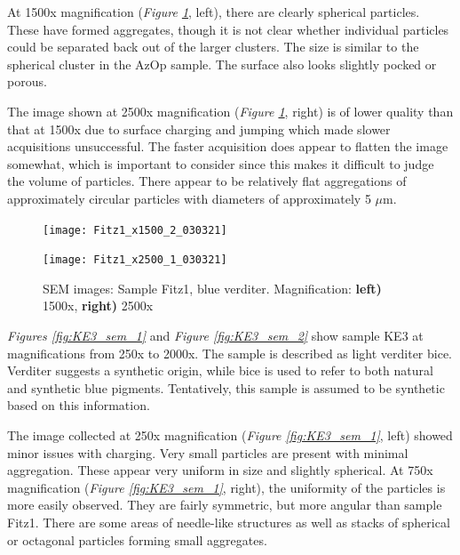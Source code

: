 At 1500x magnification (\textit{Figure \ref{fig:Fitz1_sem_2}}, left), there are clearly spherical particles. These have formed aggregates, though it is not clear whether individual particles could be separated back out of the larger clusters. The size is similar to the spherical cluster in the AzOp sample. The surface also looks slightly pocked or porous. 

The image shown at 2500x magnification (\textit{Figure \ref{fig:Fitz1_sem_2}}, right) is of lower quality than that at 1500x due to surface charging and jumping which made slower acquisitions unsuccessful. The faster acquisition does appear to flatten the image somewhat, which is important to consider since this makes it difficult to judge the volume of particles. There appear to be relatively flat aggregations of approximately circular particles with diameters of approximately 5 $\mu$m.

\begin{figure}[H]
\centering
\begin{minipage}{.45\textwidth}
  \centering
  \texttt{[image: Fitz1\_x1500\_2\_030321]}
\end{minipage}
\begin{minipage}{.45\textwidth}
  \centering
  \texttt{[image: Fitz1\_x2500\_1\_030321]}
\end{minipage}
\caption[SEM images: Sample Fitz1, blue verditer]{SEM images: Sample Fitz1, blue verditer. Magnification: \textbf{left)} 1500x, \textbf{right)} 2500x}
\label{fig:Fitz1_sem_2}
\end{figure}


\textit{Figures \ref{fig:KE3_sem_1}} and \textit{Figure \ref{fig:KE3_sem_2}} show sample KE3 at magnifications from 250x to 2000x. The sample is described as light verditer bice. Verditer suggests a synthetic origin, while bice is used to refer to both natural and synthetic blue pigments. Tentatively, this sample is assumed to be synthetic based on this information.

The image collected at 250x magnification (\textit{Figure \ref{fig:KE3_sem_1}}, left) showed minor issues with charging. Very small particles are present with minimal aggregation. These appear very uniform in size and slightly spherical. At 750x magnification (\textit{Figure \ref{fig:KE3_sem_1}}, right), the uniformity of the particles is more easily observed. They are fairly symmetric, but more angular than sample Fitz1. There are some areas of needle-like structures as well as stacks of spherical or octagonal particles forming small aggregates.

